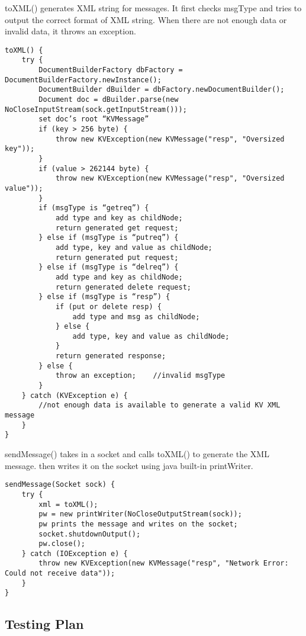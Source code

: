 \documentclass{article}
\begin{document}
toXML() generates XML string for messages. It first checks msgType and tries to output the correct format of XML string. When there are not enough data or invalid data, it throws an exception.
\begin{verbatim}
toXML() {
    try {
        DocumentBuilderFactory dbFactory = DocumentBuilderFactory.newInstance();
        DocumentBuilder dBuilder = dbFactory.newDocumentBuilder();
        Document doc = dBuilder.parse(new NoCloseInputStream(sock.getInputStream()));
        set doc’s root “KVMessage”
        if (key > 256 byte) {
            throw new KVException(new KVMessage("resp", "Oversized key"));
        }
        if (value > 262144 byte) {
            throw new KVException(new KVMessage("resp", "Oversized value"));
        }
        if (msgType is “getreq”) {
            add type and key as childNode;
            return generated get request;
        } else if (msgType is “putreq”) {
            add type, key and value as childNode;
            return generated put request;
        } else if (msgType is “delreq”) {
            add type and key as childNode;
            return generated delete request;
        } else if (msgType is “resp”) {
            if (put or delete resp) {
                add type and msg as childNode;
            } else {
                add type, key and value as childNode;
            }
            return generated response;
        } else {
            throw an exception;    //invalid msgType
        }
    } catch (KVException e) {
        //not enough data is available to generate a valid KV XML message
    }
}
\end{verbatim}

sendMessage() takes in a socket and calls toXML() to generate the XML message. then writes
it on the socket using java built-in printWriter.
\begin{verbatim}
sendMessage(Socket sock) {
    try {
        xml = toXML();
        pw = new printWriter(NoCloseOutputStream(sock));
        pw prints the message and writes on the socket;
        socket.shutdownOutput();
        pw.close();
    } catch (IOException e) {
        throw new KVException(new KVMessage("resp", "Network Error: Could not receive data"));
    }
}
\end{verbatim}

\subsection*{Testing Plan}
\end{document}
